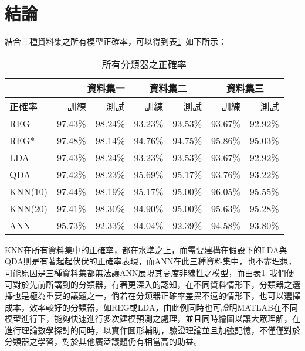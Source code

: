 \section{結論}
結合三種資料集之所有模型正確率，可以得到表\ref{tab:all_result}\ 如下所示：
\begin{table}[H]				
		\caption{所有分類器之正確率}\label{tab:all_result}
		\centering
		\extrarowheight=10pt
		\begin{tabular}{l|rr|rr|rr} 
		\hline
\multicolumn{3}{r}{資料集一}	&\multicolumn{2}{c}{資料集二}&\multicolumn{2}{c}{資料集三}\\
		\hline		
   正確率&訓練 & 測試 &訓練 & 測試 &訓練 & 測試  \\ \hline 
REG& 97.43\% &98.24\% &93.23\% &93.53\% &93.67\% & 92.92\% \\ 	
REG*& 97.48\% &98.14\% &94.76\% &94.75\% &95.86\% &95.03\%   \\ 	
LDA& 97.43\% &98.24\% &93.23\% &93.53\% &93.67\% &92.92\%   \\ 
QDA& 97.42\% &98.23\% &95.69\% &95.17\% &93.76\% &93.22\%   \\ 
KNN(10)& 97.44\% &98.19\% &95.17\% &95.00\% &96.05\% &95.55\%   \\ 
KNN(20)& 97.41\% &98.30\% &94.90\% &95.00\% &95.63\% &95.28\%   \\ 
ANN& 95.73\% &92.33\% &94.04\% &92.39\% &94.58\% &93.80\%   \\ 	

 
		\hline					
		\end{tabular}
	\end{table}		
		KNN在所有資料集中的正確率，都在水準之上，而需要建構在假設下的LDA與QDA則是有著起起伏伏的正確率表現，而ANN在此三種資料集中，也不盡理想，可能原因是三種資料集都無法讓ANN展現其高度非線性之模型，而由表\ref{tab:all_result}\ 我們便可對於先前所講到的分類器，有著更深入的認知，在不同資料情形下，分類器之選擇也是極為重要的議題之一，倘若在分類器正確率差異不遠的情形下，也可以選擇成本，效率較好的分類器，如REG或LDA，由此例同時也可證明MATLAB在不同模型進行下，能夠快速進行多次建模預測之處理，並且同時繪圖以讓大眾理解，在進行理論數學探討的同時，以實作圖形輔助，驗證理論並且加強記憶，不僅僅對於分類器之學習，對於其他廣泛議題仍有相當高的助益。
	
		
		
		
		
		
		
		
		
		